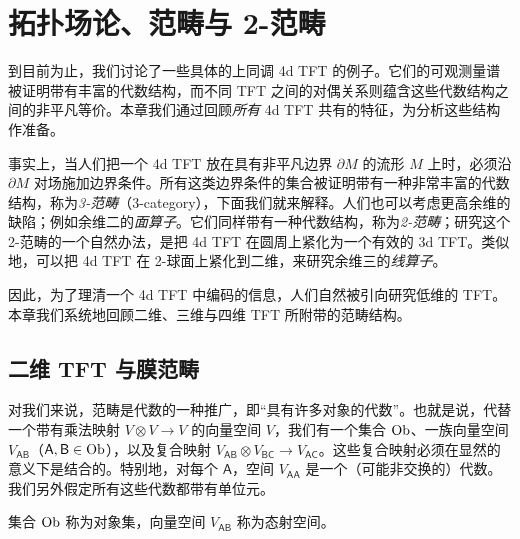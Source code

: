 
\chapter{拓扑场论、范畴与 2-范畴}

到目前为止，我们讨论了一些具体的上同调 4d TFT 的例子。它们的可观测量谱被证明带有丰富的代数结构，而不同 TFT 之间的对偶关系则蕴含这些代数结构之间的非平凡等价。本章我们通过回顾\emph{所有} 4d TFT 共有的特征，为分析这些结构作准备。


事实上，当人们把一个 4d TFT 放在具有非平凡边界 $\partial M$ 的流形 $M$ 上时，必须沿 $\partial M$ 对场施加边界条件。所有这类边界条件的集合被证明带有一种非常丰富的代数结构，称为\emph{3-范畴}（3-category），下面我们就来解释。人们也可以考虑更高余维的缺陷；例如余维二的\emph{面算子}。它们同样带有一种代数结构，称为\emph{2-范畴}；研究这个 2-范畴的一个自然办法，是把 4d TFT 在圆周上紧化为一个有效的 3d TFT。类似地，可以把 4d TFT 在 2-球面上紧化到二维，来研究余维三的\emph{线算子}。

因此，为了理清一个 4d TFT 中编码的信息，人们自然被引向研究低维的 TFT。本章我们系统地回顾二维、三维与四维 TFT 所附带的范畴结构。

\section{二维 TFT 与膜范畴}

对我们来说，范畴是代数的一种推广，即“具有许多对象的代数”。也就是说，代替一个带有乘法映射 $V\otimes V\to V$ 的向量空间 $V$，我们有一个集合 $\operatorname{Ob}$、一族向量空间 $V_{\mathsf{A}\mathsf{B}}$（$\mathsf{A},\mathsf{B}\in\operatorname{Ob}$），以及复合映射 $V_{\mathsf{A}\mathsf{B}}\otimes V_{\mathsf{B}\mathsf{C}}\to V_{\mathsf{A}\mathsf{C}}$。这些复合映射必须在显然的意义下是结合的。特别地，对每个 $\mathsf{A}$，空间 $V_{\mathsf{A}\mathsf{A}}$ 是一个（可能非交换的）代数。我们另外假定所有这些代数都带有单位元。

集合 $\operatorname{Ob}$ 称为对象集，向量空间 $V_{\mathsf{A}\mathsf{B}}$ 称为态射空间。


